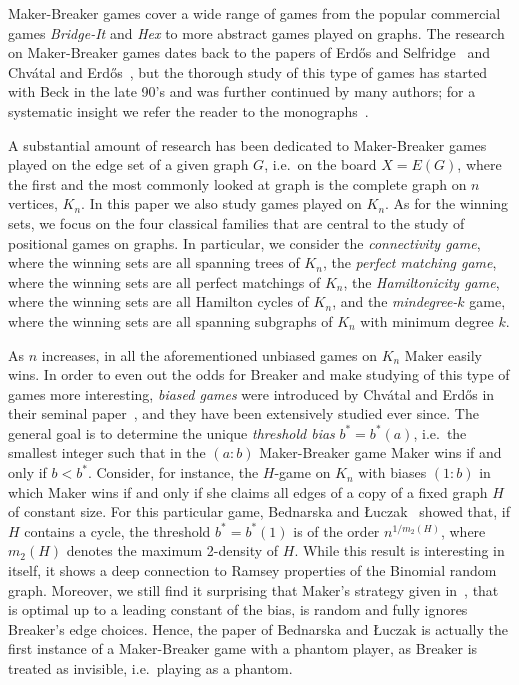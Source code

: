 \documentclass[11pt, a4paper]{article}
\numberwithin{equation}{section}
\numberwithin{figure}{section}
\begin{document}
Maker-Breaker games cover a wide range of games from the popular commercial games \emph{Bridge-It} and \emph{Hex} to more abstract games played on graphs. The research on Maker-Breaker games dates back to the papers of Erd\H{o}s and Selfridge~\cite{erdos1973combinatorial} and Chv\'atal and Erd\H{o}s~\cite{chvatal1978biased}, but the thorough study of this type of games has started with Beck in the late 90's and was further continued by many authors; for a systematic insight we refer the reader to the monographs~\cite{beck2008combinatorial,hefetz2014positional}.

A substantial amount of research has been dedicated to Maker-Breaker games played on the edge set of a given graph $G$, i.e.~on the board $X = E(G)$, where the first and the most commonly looked at graph is the complete graph on $n$ vertices, $K_n$. In this paper we also study games played on $K_n$. 
As for the winning sets, we focus on the four classical families that are central to the study of positional games on graphs. In particular, we consider the \emph{connectivity game}, where the winning sets are all spanning trees of $K_n$, the \emph{perfect matching game}, where the winning sets are all perfect matchings of $K_n$, the \emph{Hamiltonicity game}, where the winning sets are all Hamilton cycles of $K_n$, and the \emph{mindegree-$k$} game, where the winning sets are all spanning subgraphs of $K_n$ with minimum degree $k$.  

As $n$ increases, in all the aforementioned unbiased games on $K_n$ Maker easily wins. In order to even out the odds for Breaker and make studying of this type of games more interesting, \emph{biased games} were introduced by Chv\'{a}tal and Erd\H{o}s in their seminal paper~\cite{chvatal1978biased}, and they have been extensively studied ever since. The general goal is to determine the unique \emph{threshold bias} $b^*=b^*(a)$, i.e.~the smallest integer such that in the $(a:b)$ Maker-Breaker game Maker wins if and only if $b<b^*$. 
Consider, for instance, the $H$-game on $K_n$
with biases $(1:b)$ in which Maker wins if and only if she claims all edges of a copy of a fixed graph $H$ of constant size.
For this particular game, Bednarska and {\L}uczak~\cite{bednarska2000biased} showed that, if $H$ contains a cycle, the threshold $b^*=b^*(1)$ is of the order $n^{1/m_2(H)}$, where $m_2(H)$ denotes the maximum 2-density of $H$. While this result is interesting in itself, it shows a deep connection to Ramsey properties of the Binomial random graph. Moreover, we still find it surprising that Maker's strategy given in~\cite{bednarska2000biased}, that is optimal up to a leading constant of the bias, is random and fully ignores Breaker's edge choices. 
Hence, the paper of Bednarska and {\L}uczak is actually the first instance of a Maker-Breaker game with a phantom player, as Breaker is treated as invisible, i.e.~playing as a phantom.
\end{document}
